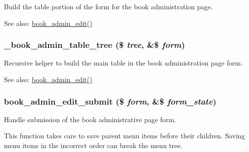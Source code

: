 Build the table portion of the form for the book administration page.

\begin{Desc}
\item[See also:]\hyperlink{group__forms_g3add8d3b6439de3883a30986428fdc87}{book\_\-admin\_\-edit()} \end{Desc}
\hypertarget{book_8admin_8inc_67224aa7f69e5f25baca3d08b4b7dc5c}{
\subsubsection[{\_\-book\_\-admin\_\-table\_\-tree}]{\setlength{\rightskip}{0pt plus 5cm}\_\-book\_\-admin\_\-table\_\-tree (\$ {\em tree}, \/  \&\$ {\em form})}}
\label{book_8admin_8inc_67224aa7f69e5f25baca3d08b4b7dc5c}


Recursive helper to build the main table in the book administration page form.

\begin{Desc}
\item[See also:]\hyperlink{group__forms_g3add8d3b6439de3883a30986428fdc87}{book\_\-admin\_\-edit()} \end{Desc}
\hypertarget{book_8admin_8inc_f0fb9b52db15bf3bc44c63d5b9042c69}{
\subsubsection[{book\_\-admin\_\-edit\_\-submit}]{\setlength{\rightskip}{0pt plus 5cm}book\_\-admin\_\-edit\_\-submit (\$ {\em form}, \/  \&\$ {\em form\_\-state})}}
\label{book_8admin_8inc_f0fb9b52db15bf3bc44c63d5b9042c69}


Handle submission of the book administrative page form.

This function takes care to save parent menu items before their children. Saving menu items in the incorrect order can break the menu tree.

